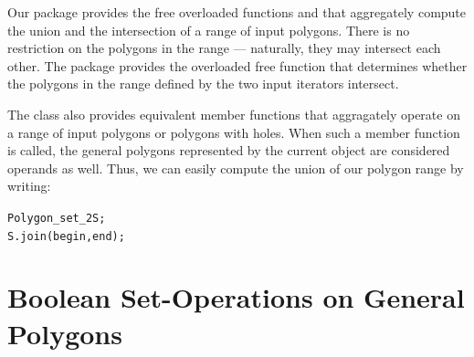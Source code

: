 Our package provides the free overloaded functions  and
 that aggregately compute the union and the intersection
of a range of input polygons. There is no restriction on the polygons in the
range --- naturally, they may intersect each other.
The package provides the overloaded free function 
 that determines whether the polygons in the
range defined by the two input iterators \ccc{[begin, end)} intersect.

The class  also provides equivalent member
functions that aggragately operate on a range of input polygons or
polygons with holes. When such a member function is called, the general 
polygons represented by the current object are considered operands as 
well. Thus, we can easily compute the union of our polygon range by
writing:
\begin{alltt}
  Polygon_set_2   S;
  S.join (begin, end);
\end{alltt} 


\section{Boolean Set-Operations on General Polygons}
\label{bops_sec:bops_gen}

